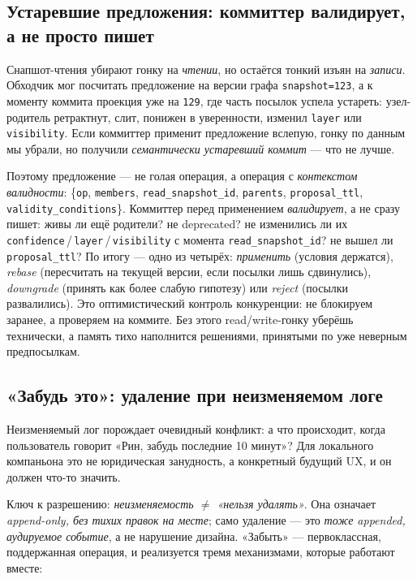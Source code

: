 \subsection{Устаревшие предложения: коммиттер валидирует, а не просто пишет}
\label{sec:staleproposals}

Снапшот-чтения убирают гонку на \emph{чтении}, но остаётся тонкий изъян на
\emph{записи}. Обходчик мог посчитать предложение на версии графа
\texttt{snapshot=123}, а к моменту коммита проекция уже на \texttt{129}, где часть
посылок успела устареть: узел-родитель ретрактнут, слит, понижен в уверенности,
изменил \texttt{layer} или \texttt{visibility}. Если коммиттер применит предложение
вслепую, гонку по данным мы убрали, но получили \emph{семантически устаревший коммит} —
что не лучше.

Поэтому предложение — не голая операция, а операция с \emph{контекстом валидности}:
\{\texttt{op}, \texttt{members}, \texttt{read\_snapshot\_id}, \texttt{parents},
\texttt{proposal\_ttl}, \texttt{validity\_conditions}\}. Коммиттер перед применением
\emph{валидирует}, а не сразу пишет: живы ли ещё родители? не deprecated? не изменились
ли их \texttt{confidence}\,/\,\texttt{layer}\,/\,\texttt{visibility} с момента
\texttt{read\_snapshot\_id}? не вышел ли \texttt{proposal\_ttl}? По итогу — одно из
четырёх: \emph{применить} (условия держатся), \emph{rebase} (пересчитать на текущей
версии, если посылки лишь сдвинулись), \emph{downgrade} (принять как более слабую
гипотезу) или \emph{reject} (посылки развалились). Это оптимистический контроль
конкуренции: не блокируем заранее, а проверяем на коммите. Без этого read/write-гонку
уберёшь технически, а память тихо наполнится решениями, принятыми по уже неверным
предпосылкам.

\subsection{«Забудь это»: удаление при неизменяемом логе}
\label{sec:forget}

Неизменяемый лог порождает очевидный конфликт: а что происходит, когда пользователь
говорит «Рин, забудь последние 10 минут»? Для локального компаньона это не юридическая
занудность, а конкретный будущий UX, и он должен что-то значить.

Ключ к разрешению: \emph{неизменяемость $\ne$ «нельзя удалять»}. Она означает
\emph{append-only, без тихих правок на месте}; само удаление — это \emph{тоже
appended, аудируемое событие}, а не нарушение дизайна. «Забыть» — первоклассная,
поддержанная операция, и реализуется тремя механизмами, которые работают вместе:

